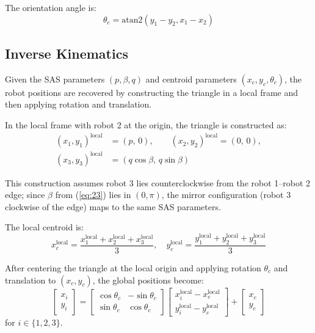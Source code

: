 \documentclass[lettersize,journal]{IEEEtran}
\begin{document}
The orientation angle is:
\begin{equation}\label{eq:24}
\theta_c = \text{atan2}(y_1 - y_2, x_1 - x_2)
\end{equation}

\subsection{Inverse Kinematics}

Given the SAS parameters $(p, \beta, q)$ and centroid parameters $(x_c, y_c, \theta_c)$, the robot positions are recovered by constructing the triangle in a local frame and then applying rotation and translation.

In the local frame with robot 2 at the origin, the triangle is constructed as:
\begin{equation}\label{eq:25}
\begin{aligned}
(x_1, y_1)^{\text{local}} &= (p,\, 0), \qquad (x_2, y_2)^{\text{local}} = (0,\, 0), \\
(x_3, y_3)^{\text{local}} &= (q\cos\beta,\, q\sin\beta)
\end{aligned}
\end{equation}

This construction assumes robot 3 lies counterclockwise from the robot 1--robot 2 edge; since $\beta$ from (\ref{eq:23}) lies in $(0, \pi)$, the mirror configuration (robot 3 clockwise of the edge) maps to the same SAS parameters.

The local centroid is:
\begin{equation}\label{eq:28}
x_c^{\text{local}} = \frac{x_1^{\text{local}} + x_2^{\text{local}} + x_3^{\text{local}}}{3}, \quad y_c^{\text{local}} = \frac{y_1^{\text{local}} + y_2^{\text{local}} + y_3^{\text{local}}}{3}
\end{equation}

After centering the triangle at the local origin and applying rotation $\theta_c$ and translation to $(x_c, y_c)$, the global positions become:
\begin{equation}\label{eq:29}
\begin{bmatrix} x_i \\ y_i \end{bmatrix} = \begin{bmatrix} \cos\theta_c & -\sin\theta_c \\ \sin\theta_c & \cos\theta_c \end{bmatrix} \begin{bmatrix} x_i^{\text{local}} - x_c^{\text{local}} \\ y_i^{\text{local}} - y_c^{\text{local}} \end{bmatrix} + \begin{bmatrix} x_c \\ y_c \end{bmatrix}
\end{equation}
for $i \in \{1, 2, 3\}$.
\end{document}
